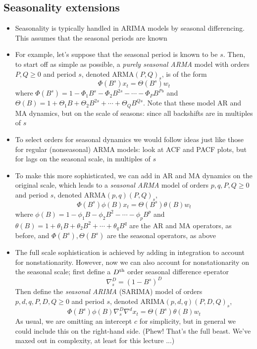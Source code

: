 \documentclass{article}
\begin{document}
\subsection{Seasonality extensions}

\begin{itemize}
\item Seasonality is typically handled in ARIMA models by seasonal
  differencing. This assumes that the seasonal periods are known

\item For example, let's suppose that the seasonal period is known to be
  $s$. Then, to start off as simple as possible, a \emph{purely seasonal ARMA}
  model with orders $P,Q \geq 0$ and period $s$, denoted ARMA$(P,Q)_s$, is of 
  the form   
  \begin{equation}
  \label{eq:pure-sarma-pq}
  \Phi(B^s) x_t = \Theta(B^s) w_t  
  \end{equation}
  where $\Phi(B^s) = 1 - \Phi_1 B^s - \Phi_2 B^{2s} - \cdots - \Phi_P B^{Ps}$
  and $\Theta(B) = 1 + \Theta_1 B + \Theta_2 B^{2s} + \cdots + \Theta_Q
  B^{Qs}$. Note that these model AR and MA dynamics, but on the scale of
  seasons: since all backshifts are in multiples of $s$

\item To select orders for seasonal dynamics we would follow ideas just like
  those for regular (nonseasonal) ARMA models: look at ACF and PACF plots, but
  for lags on the seasonal scale, in multiples of $s$

\item To make this more sophisticated, we can add in AR and MA dynamics on
  the original scale, which leads to a \emph{seasonal ARMA} model of orders 
  $p,q,P,Q \geq 0$ and period $s$, denoted ARMA$(p,q)(P,Q)_s$,   
  \begin{equation}
  \label{eq:sarma-pq}
  \Phi(B^s) \phi(B) x_t = \Theta(B^s) \theta(B) w_t  
  \end{equation}
  where $\phi(B) = 1 - \phi_1 B - \phi_2 B^2 - \cdots - \phi_p B^p$ and
  $\theta(B) = 1 + \theta_1 B + \theta_2 B^2 + \cdots + \theta_q B^q$ are the AR 
  and MA operators, as before, and $\Phi(B^s), \Theta(B^s)$ are the seasonal
  operators, as above

\item The full scale sophistication is achieved by adding in integration to
  account for nonstationarity. However, now we can also account for
  nonstationarity on the seasonal scale; first define a $D^{\textnormal{th}}$ order seasonal
  difference eperator
  \[
  \nabla_s^D = (1 - B^s)^D 
  \]
  Then define the \emph{seasonal ARIMA} (SARIMA) model of orders $p,d,q,P,D,Q 
  \geq 0$ and period $s$, denoted ARIMA$(p,d,q)(P,D,Q)_s$,   
  \begin{equation}
  \label{eq:sarima-pdq}
  \Phi(B^s) \phi(B) \nabla_s^D \nabla^d x_t = \Theta(B^s) \theta(B) w_t  
  \end{equation}
  As usual, we are omitting an intercept $c$ for simplicity, but in general we
  could include this on the right-hand side. (Phew! That's the full beast. We've
  maxed out in complexity, at least for this lecture ...)


\end{itemize}
\end{document}
